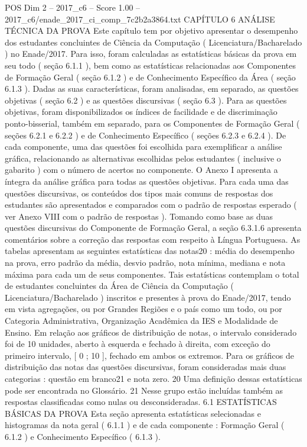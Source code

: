 \begin{textsample}{POS Dim 2 – 2017\_c6 – Score 1.00 – 2017\_c6/enade\_2017\_ci\_comp\_7c2b2a3864.txt}  \label{ex:f2_pos_269}
CAPÍTULO 6 ANÁLISE TÉCNICA DA PROVA Este capítulo tem por objetivo apresentar o desempenho dos estudantes concluintes de Ciência da Computação ( Licenciatura/Bacharelado ) no Enade/2017.
Para isso, foram calculadas as estatísticas básicas da prova em seu todo ( seção 6.1.1 ), bem como as estatísticas relacionadas aos Componentes de Formação Geral ( seção 6.1.2 ) e de Conhecimento Específico da Área ( seção 6.1.3 ).
Dadas as suas características, foram analisadas, em separado, as questões objetivas ( seção 6.2 ) e as questões discursivas ( seção 6.3 ).
Para as questões objetivas, foram disponibilizados os índices de facilidade e de discriminação ponto-bisserial, também em separado, para os Componentes de Formação Geral ( seções 6.2.1 e 6.2.2 ) e de Conhecimento Específico ( seções 6.2.3 e 6.2.4 ).
De cada componente, uma das questões foi escolhida para exemplificar a análise gráfica, relacionando as alternativas escolhidas pelos estudantes ( inclusive o gabarito ) com o número de acertos no componente.
O Anexo I apresenta a íntegra da análise gráfica para todas as questões objetivas.
Para cada uma das questões discursivas, os conteúdos dos tipos mais comuns de respostas dos estudantes são apresentados e comparados com o padrão de respostas esperado ( ver Anexo VIII com o padrão de respostas ).
Tomando como base as duas questões discursivas do Componente de Formação Geral, a seção 6.3.1.6 apresenta comentários sobre a correção das respostas com respeito à Língua Portuguesa.
As tabelas apresentam as seguintes estatísticas das notas20 : média do desempenho na prova, erro padrão da média, desvio padrão, nota mínima, mediana e nota máxima para cada um de seus componentes.
Tais estatísticas contemplam o total de estudantes concluintes da Área de Ciência da Computação ( Licenciatura/Bacharelado ) inscritos e presentes à prova do Enade/2017, tendo em vista agregações, ou por Grandes Regiões e o país como um todo, ou por Categoria Administrativa, Organização Acadêmica da IES e Modalidade de Ensino.
Em relação aos gráficos de distribuição de notas, o intervalo considerado foi de 10 unidades, aberto à esquerda e fechado à direita, com exceção do primeiro intervalo, [ 0 ; 10 ], fechado em ambos os extremos.
Para os gráficos de distribuição das notas das questões discursivas, foram consideradas mais duas categorias : questão em branco21 e nota zero. 20 Uma definição dessas estatísticas pode ser encontrada no Glossário. 21 Nesse grupo estão incluídas também as respostas classificadas como nulas ou desconsideradas. 6.1 ESTATÍSTICAS BÁSICAS DA PROVA Esta seção apresenta estatísticas selecionadas e histogramas da nota geral ( 6.1.1 ) e de cada componente : Formação Geral ( 6.1.2 ) e Conhecimento Específico ( 6.1.3 ).

\end{textsample}

